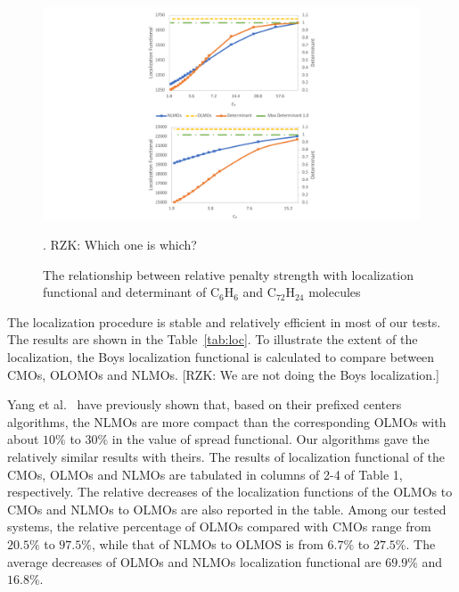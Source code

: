 \documentclass[aps,prl,reprint,amsmath,amssymb]{revtex4-1}
\begin{document}
\begin{figure}[htbp]
\includegraphics[scale=0.6]{figure_2.pdf} 
  \caption{The relationship between relative penalty strength with localization functional and determinant of C$_6$H$_6$ and C$_{72}$H$_{24}$ molecules}. RZK: Which one is which?
\end{figure}

The localization procedure is stable and relatively efficient in most of our tests.
The results are shown in the Table~\ref{tab:loc}.
To illustrate the extent of the localization, the Boys localization functional is calculated to compare between CMOs, OLOMOs and NLMOs. [RZK: We are not doing the Boys localization.]

Yang et al.~\cite{feng2004An_efficient, cui2010efficient} have previously shown that, based on their prefixed centers algorithms, the NLMOs are more compact than the corresponding OLMOs with about $10\%$ to $30\%$ in the value of spread functional.
Our algorithms gave the relatively similar results with theirs.
The results of localization functional of the CMOs, OLMOs and NLMOs are tabulated in columns of 2-4 of Table 1, respectively.
The relative decreases of the localization functions of the OLMOs to CMOs and NLMOs to OLMOs are also reported in the table.
Among our tested systems, the relative percentage of OLMOs compared with CMOs range from $20.5\%$ to $97.5\%$, while that of NLMOs to OLMOS is from $6.7\%$ to $27.5\%$.
The average decreases of OLMOs and NLMOs localization functional are $69.9\%$ and $16.8\%$.
\end{document}
